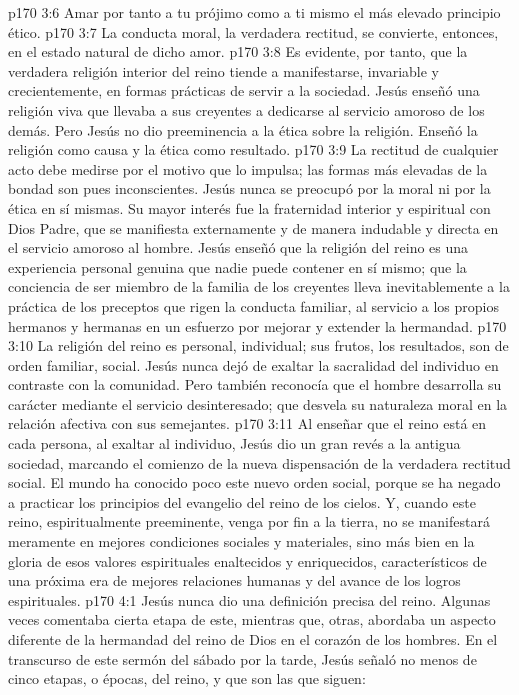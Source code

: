 \vs p170 3:6 Amar por tanto a tu prójimo como a ti mismo  el más elevado principio ético.
\vs p170 3:7 La conducta moral, la verdadera rectitud, se convierte, entonces, en el estado natural de dicho amor.
\vs p170 3:8 \pc Es evidente, por tanto, que la verdadera religión interior del reino tiende a manifestarse, invariable y crecientemente, en formas prácticas de servir a la sociedad. Jesús enseñó una religión viva que llevaba a sus creyentes a dedicarse al servicio amoroso de los demás. Pero Jesús no dio preeminencia a la ética sobre la religión. Enseñó la religión como causa y la ética como resultado.
\vs p170 3:9 La rectitud de cualquier acto debe medirse por el motivo que lo impulsa; las formas más elevadas de la bondad son pues inconscientes. Jesús nunca se preocupó por la moral ni por la ética en sí mismas. Su mayor interés fue la fraternidad interior y espiritual con Dios Padre, que se manifiesta externamente y de manera indudable y directa en el servicio amoroso al hombre. Jesús enseñó que la religión del reino es una experiencia personal genuina que nadie puede contener en sí mismo; que la conciencia de ser miembro de la familia de los creyentes lleva inevitablemente a la práctica de los preceptos que rigen la conducta familiar, al servicio a los propios hermanos y hermanas en un esfuerzo por mejorar y extender la hermandad.
\vs p170 3:10 La religión del reino es personal, individual; sus frutos, los resultados, son de orden familiar, social. Jesús nunca dejó de exaltar la sacralidad del individuo en contraste con la comunidad. Pero también reconocía que el hombre desarrolla su carácter mediante el servicio desinteresado; que desvela su naturaleza moral en la relación afectiva con sus semejantes.
\vs p170 3:11 Al enseñar que el reino está en cada persona, al exaltar al individuo, Jesús dio un gran revés a la antigua sociedad, marcando el comienzo de la nueva dispensación de la verdadera rectitud social. El mundo ha conocido poco este nuevo orden social, porque se ha negado a practicar los principios del evangelio del reino de los cielos. Y, cuando este reino, espiritualmente preeminente, venga por fin a la tierra, no se manifestará meramente en mejores condiciones sociales y materiales, sino más bien en la gloria de esos valores espirituales enaltecidos y enriquecidos, característicos de una próxima era de mejores relaciones humanas y del avance de los logros espirituales.
\vs p170 4:1 Jesús nunca dio una definición precisa del reino. Algunas veces comentaba cierta etapa de este, mientras que, otras, abordaba un aspecto diferente de la hermandad del reino de Dios en el corazón de los hombres. En el transcurso de este sermón del sábado por la tarde, Jesús señaló no menos de cinco etapas, o épocas, del reino, y que son las que siguen:
